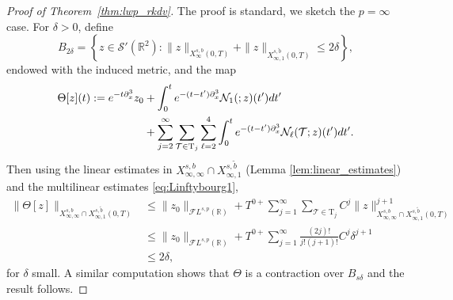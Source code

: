 \documentclass[%
11pt,  reqno]{amsart}
\makeatletter
\newcommand{\5}{\textup{V}}
\newcommand{\noi}{\noindent}
\newcommand{\wt}{\widetilde}
\theoremstyle{remark}
\newcommand{\R}{\mathbb{R}}
\newcommand{\TT}{\mathcal{T}}
\newcommand{\Tr}{\mathrm{T}}
\renewcommand{\l}{\ell}
\def\<#1>{\csname MH@symb@#1\endcsname}
\numberwithin{equation}{section}
\numberwithin{theorem}{section}
\newcommand{\Ncal}{\mathcal{N}}
\newcommand{\andreia}[1]{\marginpar{\color{purple} $\Leftarrow\Leftarrow\Leftarrow$}{\smallskip \noi\color{purple}ANDREIA: #1}\smallskip}
\makeatother
\begin{document}





\begin{proof}[Proof of Theorem~\ref{thm:lwp_rkdv}]
    The proof is standard, we sketch the $p=\infty$ case. For $\delta>0$, define
	$$
	B_{2\delta}=\left\{ z\in \mathcal{S}'(\R^2) : \|z\|_{X^{s,b}_{\infty}(0,T)} + \|z\|_{X^{s,\tilde{b}}_{\infty,1}(0,T)}\le 2\delta \right\},
	$$
    endowed with the induced metric,
    and the map
    \begin{align}
		\Theta[z](t) := e^{-t\partial_x^3}z_0 
        &+ \int_0^t e^{-(t-t')\partial_x^3} \Ncal_1(\<1>; z)(t')dt' 
        \\&+ 
        \sum_{j=2}^\infty \sum_{\TT \in \Tr_j} \sum_{\l=2}^4 
        \int_0^t e^{-(t-t')\partial_x^3} \Ncal_\l (\TT;  z)(t')dt'.
        \label{eq:Theta}
\end{align}
Then using the linear estimates in $X^{s,b}_{\infty,\infty}\cap X^{s,\wt{b}}_{\infty,1}$ (Lemma \ref{lem:linear_estimates}) and the multilinear estimates \eqref{eq:Linftybourg1}, 
\begin{align*}
		\|\Theta[z]\|_{X^{s,b}_{\infty,\infty}\cap X^{s,\wt{b}}_{\infty,1}(0,T)} &\le \|z_0\|_{\mathcal{F}L^{s,p}(\R)} + T^{0+} \sum_{j=1}^\infty \sum_{\TT \in \Tr_{j}}  C^j\|z\|_{X^{s,b}_{\infty,\infty}\cap X^{s,\wt{b}}_{\infty,1}(0,T)}^{j+1} \\&\le \|z_0\|_{\mathcal{F}L^{s,p}(\R)} + T^{0+} \sum_{j=1}^\infty \frac{(2j)!}{j!(j+1)!} C^j \delta^{j+1}\\&\le 2\delta,
\end{align*}
for $\delta$ small. A similar computation shows that $\Theta$ is a contraction over $B_{s\delta}$ and the result follows.
\end{proof}
\end{document}
